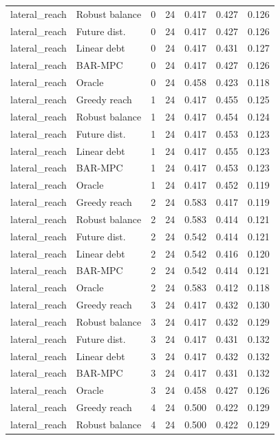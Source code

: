 \begin{longtable}{llrrrrr}
lateral\_reach & Robust balance & 0 & 24 & 0.417 & 0.427 & 0.126 \\
lateral\_reach & Future dist. & 0 & 24 & 0.417 & 0.427 & 0.126 \\
lateral\_reach & Linear debt & 0 & 24 & 0.417 & 0.431 & 0.127 \\
lateral\_reach & BAR-MPC & 0 & 24 & 0.417 & 0.427 & 0.126 \\
lateral\_reach & Oracle & 0 & 24 & 0.458 & 0.423 & 0.118 \\
lateral\_reach & Greedy reach & 1 & 24 & 0.417 & 0.455 & 0.125 \\
lateral\_reach & Robust balance & 1 & 24 & 0.417 & 0.454 & 0.124 \\
lateral\_reach & Future dist. & 1 & 24 & 0.417 & 0.453 & 0.123 \\
lateral\_reach & Linear debt & 1 & 24 & 0.417 & 0.455 & 0.123 \\
lateral\_reach & BAR-MPC & 1 & 24 & 0.417 & 0.453 & 0.123 \\
lateral\_reach & Oracle & 1 & 24 & 0.417 & 0.452 & 0.119 \\
lateral\_reach & Greedy reach & 2 & 24 & 0.583 & 0.417 & 0.119 \\
lateral\_reach & Robust balance & 2 & 24 & 0.583 & 0.414 & 0.121 \\
lateral\_reach & Future dist. & 2 & 24 & 0.542 & 0.414 & 0.121 \\
lateral\_reach & Linear debt & 2 & 24 & 0.542 & 0.416 & 0.120 \\
lateral\_reach & BAR-MPC & 2 & 24 & 0.542 & 0.414 & 0.121 \\
lateral\_reach & Oracle & 2 & 24 & 0.583 & 0.412 & 0.118 \\
lateral\_reach & Greedy reach & 3 & 24 & 0.417 & 0.432 & 0.130 \\
lateral\_reach & Robust balance & 3 & 24 & 0.417 & 0.432 & 0.129 \\
lateral\_reach & Future dist. & 3 & 24 & 0.417 & 0.431 & 0.132 \\
lateral\_reach & Linear debt & 3 & 24 & 0.417 & 0.432 & 0.132 \\
lateral\_reach & BAR-MPC & 3 & 24 & 0.417 & 0.431 & 0.132 \\
lateral\_reach & Oracle & 3 & 24 & 0.458 & 0.427 & 0.126 \\
lateral\_reach & Greedy reach & 4 & 24 & 0.500 & 0.422 & 0.129 \\
lateral\_reach & Robust balance & 4 & 24 & 0.500 & 0.422 & 0.129 \\

\end{longtable}
